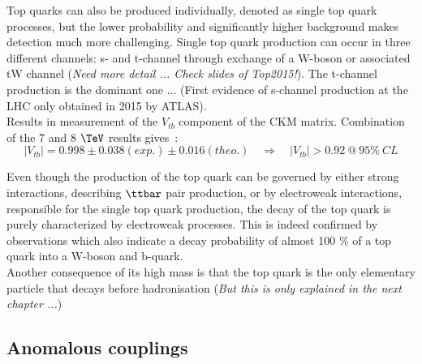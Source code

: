 Top quarks can also be produced individually, denoted as single top quark processes, but the lower probability and significantly higher background makes detection much more challenging. Single top quark production can occur in three different channels: s- and t-channel through exchange of a W-boson or associated tW channel (\textit{Need more detail ... Check slides of Top2015!}). The t-channel production is the dominant one ... (First evidence of s-channel production at the LHC only obtained in 2015 by ATLAS).
\\
Results in measurement of the $V_{tb}$ component of the CKM matrix. Combination of the 7 and 8 $\TeV$ results gives~\cite{CMSVtbResult}:
\begin{equation}
 \vert V_{tb} \vert = 0.998 \pm 0.038 (exp.) \pm 0.016 (theo.) \quad \Rightarrow \quad \vert V_{tb} \vert > 0.92 ~ @ ~ 95 \% ~ CL
\end{equation}

Even though the production of the top quark can be governed by either strong interactions, describing $\ttbar$ pair production, or by electroweak interactions, responsible for the single top quark production, the decay of the top quark is purely characterized by electroweak processes. This is indeed confirmed by observations which also indicate a decay probability of almost 100 $\%$ of a top quark into a W-boson and b-quark.
\\

Another consequence of its high mass is that the top quark is the only elementary particle that decays before hadronisation (\textit{But this is only explained in the next chapter ...})



\subsection{Anomalous couplings}